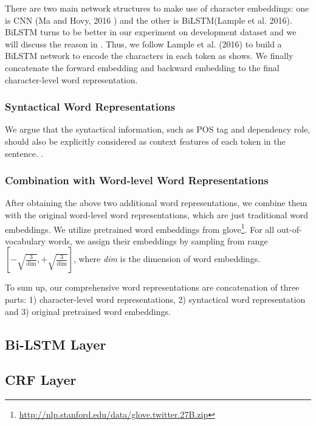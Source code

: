 There are two main network structures to make use of character embeddings: 
one is CNN (Ma and Hovy, 2016 \cite{} ) and the other is BiLSTM(Lample et al. 2016).
BiLSTM turns to be better in our experiment on development dataset and we will discuss the reason in .
Thus, we follow Lample et al. (2016) to build a BiLSTM network to encode the characters in each token as  shows. 
We finally concatenate the forward embedding and backward embedding to the final character-level word representation.



\subsubsection{Syntactical Word Representations}
We argue that the syntactical information, such as POS tag and dependency role, should also be explicitly considered as context features of each token in the sentence. 
.
 
\subsubsection{Combination with Word-level Word Representations}
After obtaining the above two additional word representations, we combine them with the original word-level word representations, which are just traditional word embeddings. 
We utilize pretrained word embeddings from glove\footnote{\url{http://nlp.stanford.edu/data/glove.twitter.27B.zip}}.
For all out-of-vocabulary words, we assign their embeddings by sampling from range $\left[-\sqrt{\frac{3}{\text{dim}}}, +\sqrt{\frac{3}{\text{dim}}}\right]$, where \textit{dim} is the dimension of word embeddings.

To sum up, our comprehensive word representations are concatenation of three parts: 1) character-level word representations, 2) syntactical word representation and 3)  original pretrained word embeddings.

\subsection{Bi-LSTM Layer}

\subsection{CRF Layer}

